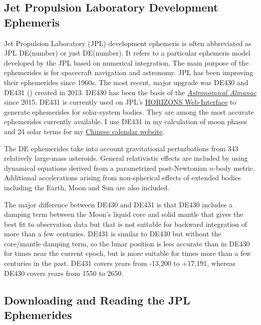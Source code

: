 \documentclass[12pt]{article}
\begin{document}
\begin{CJK}{UTF8}{bkai}
\section{Jet Propulsion Laboratory Development Ephemeris}
\label{sec:jpleph}

Jet Propulsion Laboratory (JPL) development ephemeris is often 
abbreviated as JPL DE(number) or just DE(number). It refers to a particular 
ephemeris model developed by the JPL based on numerical integration. 
The main purpose of the ephemerides is for spacecraft navigation and astronomy. 
JPL has been improving their ephemerides since 1960s. The most recent, major 
upgrade was DE430 and DE431 (\cite{folkner14})
created in 2013. DE430 has been the basis of the 
\href{https://en.wikipedia.org/wiki/Astronomical_Almanac}{\it Astronomical Almanac} 
since 2015. DE431 is currently used on JPL's \href{https://ssd.jpl.nasa.gov/horizons.cgi}
{HORIZONS Web-Interface} to generate ephemerides for solar-system bodies. 
They are among the most accurate ephemerides currently available. 
I use DE431 in my calculation of moon phases and 24 solar terms for my 
\href{../index.html}{Chinese calendar website}. 

The DE ephemerides take into account gravitational perturbations from 
343 relatively large-mass asteroids. General relativistic effects are 
included by using dynamical equations derived from a parametrized 
post-Newtonian $n$-body metric. Additional accelerations arising 
from non-spherical effects of extended bodies including the Earth, 
Moon and Sun are also included. 

The major difference between DE430 and DE431 is that DE430 includes 
a damping term between the Moon's liquid core and solid mantle that 
gives the best fit to observation data but that is not 
suitable for backward integration of more than a few centuries. 
DE431 is similar to DE430 but without the 
core/mantle damping term, so the lunar position is less accurate than 
in DE430 for times near the current epoch, but is more suitable 
for times more than a few centuries in the past. DE431 covers 
years from -13,200 to +17,191, whereas DE430 covers years from 
1550 to 2650.

\subsection{Downloading and Reading the JPL Ephemerides}


\end{CJK}
\end{document}
